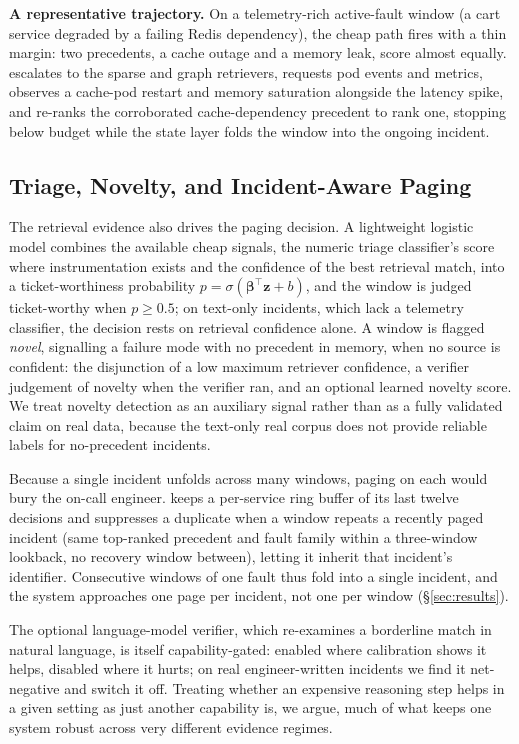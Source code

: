 \smallskip
\noindent\textbf{A representative trajectory.} On a telemetry-rich active-fault
window (a cart service degraded by a failing Redis dependency), the cheap path
fires with a thin margin: two precedents, a cache outage and a memory leak, score
almost equally. \sys{} escalates to the sparse and graph retrievers, requests pod
events and metrics, observes a cache-pod restart and memory saturation alongside
the latency spike, and re-ranks the corroborated cache-dependency precedent to
rank one, stopping below budget while the state layer folds the window into the
ongoing incident.

\subsection{Triage, Novelty, and Incident-Aware Paging}
\label{sec:approach-state}

The retrieval evidence also drives the paging decision. A lightweight logistic
model combines the available cheap signals, the numeric triage classifier's score
where instrumentation exists and the confidence of the best retrieval match, into
a ticket-worthiness probability $p=\sigma(\boldsymbol{\beta}^{\top}\mathbf{z}+b)$,
and the window is judged ticket-worthy when $p\ge 0.5$; on text-only incidents,
which lack a telemetry classifier, the decision rests on retrieval confidence
alone. A window is flagged \emph{novel}, signalling a failure mode with no
precedent in memory, when no source is confident: the disjunction of a low maximum
retriever confidence, a verifier judgement of novelty when the verifier ran, and an
optional learned novelty score. We treat novelty detection as an auxiliary signal rather than as a fully validated claim on real data, because the text-only real corpus does not provide reliable labels for no-precedent incidents.

Because a single incident unfolds across many windows, paging on each would bury
the on-call engineer. \sys{} keeps a per-service ring buffer of its last twelve
decisions and suppresses a duplicate when a window repeats a recently paged incident
(same top-ranked precedent and fault family within a three-window lookback, no
recovery window between), letting it inherit that incident's identifier. Consecutive
windows of one fault thus fold into a single incident, and the system approaches one
page per incident, not one per window (\S\ref{sec:results}).

The optional language-model verifier, which re-examines a borderline match in natural language,
is itself capability-gated: enabled where calibration shows it helps, disabled where
it hurts; on real engineer-written incidents we find it net-negative and switch it
off. Treating whether an expensive reasoning step helps in a given setting as just
another capability is, we argue, much of what keeps one system robust across very
different evidence regimes.
